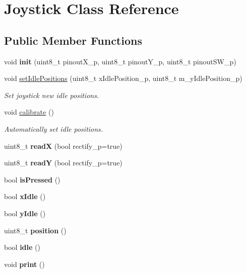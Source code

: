 \hypertarget{class_joystick}{}\section{Joystick Class Reference}
\label{class_joystick}
\subsection*{Public Member Functions}
\begin{DoxyCompactItemize}
\item 
\mbox{\label{class_joystick_add56a0e9f92176c9f12e3f12e3983588}} 
void {\bfseries init} (uint8\+\_\+t pinout\+X\+\_\+p, uint8\+\_\+t pinout\+Y\+\_\+p, uint8\+\_\+t pinout\+S\+W\+\_\+p)
\item 
void \hyperlink{class_joystick_a70f101e3395a939fb757522b14d830c9}{set\+Idle\+Positions} (uint8\+\_\+t x\+Idle\+Position\+\_\+p, uint8\+\_\+t m\+\_\+y\+Idle\+Position\+\_\+p)
\begin{DoxyCompactList}\small\item\em Set joystick new idle positions. \end{DoxyCompactList}\item 
void \hyperlink{class_joystick_ae2a8edfcf0aa98fba3e4bfb31ebc8200}{calibrate} ()
\begin{DoxyCompactList}\small\item\em Automatically set idle positions. \end{DoxyCompactList}\item 
\mbox{\label{class_joystick_a9f5a1ee24e763f47f60759ce35054d92}} 
uint8\+\_\+t {\bfseries readX} (bool rectify\+\_\+p=true)
\item 
\mbox{\label{class_joystick_a53dd4c36d46f475c330ef570e62640a7}} 
uint8\+\_\+t {\bfseries readY} (bool rectify\+\_\+p=true)
\item 
\mbox{\label{class_joystick_a67821faa398aede9f7303ee69e2e1348}} 
bool {\bfseries is\+Pressed} ()
\item 
\mbox{\label{class_joystick_a12b4e2601b66e1607c77c52364e96adc}} 
bool {\bfseries x\+Idle} ()
\item 
\mbox{\label{class_joystick_a02261229db91dab161af9744cc6ff81d}} 
bool {\bfseries y\+Idle} ()
\item 
\mbox{\label{class_joystick_af385438f23a6ed41ad3942ea1f9bf605}} 
uint8\+\_\+t {\bfseries position} ()
\item 
\mbox{\label{class_joystick_a5a2f4443f0b0e44f328bea0137e023dd}} 
bool {\bfseries idle} ()
\item 
\mbox{\label{class_joystick_afd789cfd5832facccafa3784c8016b16}} 
void {\bfseries print} ()
\end{DoxyCompactItemize}


